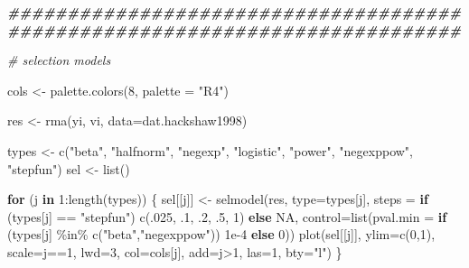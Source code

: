 \documentclass[
]{book}
\newenvironment{Shaded}{\begin{snugshade}}{\end{snugshade}}
\newcommand{\AttributeTok}[1]{\textcolor[rgb]{0.77,0.63,0.00}{#1}}
\newcommand{\CommentTok}[1]{\textcolor[rgb]{0.56,0.35,0.01}{\textit{#1}}}
\newcommand{\ConstantTok}[1]{\textcolor[rgb]{0.00,0.00,0.00}{#1}}
\newcommand{\ControlFlowTok}[1]{\textcolor[rgb]{0.13,0.29,0.53}{\textbf{#1}}}
\newcommand{\DecValTok}[1]{\textcolor[rgb]{0.00,0.00,0.81}{#1}}
\newcommand{\DocumentationTok}[1]{\textcolor[rgb]{0.56,0.35,0.01}{\textbf{\textit{#1}}}}
\newcommand{\FloatTok}[1]{\textcolor[rgb]{0.00,0.00,0.81}{#1}}
\newcommand{\FunctionTok}[1]{\textcolor[rgb]{0.00,0.00,0.00}{#1}}
\newcommand{\NormalTok}[1]{#1}
\newcommand{\OtherTok}[1]{\textcolor[rgb]{0.56,0.35,0.01}{#1}}
\newcommand{\SpecialCharTok}[1]{\textcolor[rgb]{0.00,0.00,0.00}{#1}}
\newcommand{\StringTok}[1]{\textcolor[rgb]{0.31,0.60,0.02}{#1}}
\begin{document}
\begin{Shaded}
\begin{Highlighting}[]
\DocumentationTok{\#\#\#\#\#\#\#\#\#\#\#\#\#\#\#\#\#\#\#\#\#\#\#\#\#\#\#\#\#\#\#\#\#\#\#\#\#\#\#\#\#\#\#\#\#\#\#\#\#\#\#\#\#\#\#\#\#\#\#\#\#\#\#\#\#\#\#\#\#\#\#\#\#\#\#\#}

\CommentTok{\# selection models}

\NormalTok{cols }\OtherTok{\textless{}{-}} \FunctionTok{palette.colors}\NormalTok{(}\DecValTok{8}\NormalTok{, }\AttributeTok{palette =} \StringTok{"R4"}\NormalTok{)}

\NormalTok{res }\OtherTok{\textless{}{-}} \FunctionTok{rma}\NormalTok{(yi, vi, }\AttributeTok{data=}\NormalTok{dat.hackshaw1998)}

\NormalTok{types }\OtherTok{\textless{}{-}} \FunctionTok{c}\NormalTok{(}\StringTok{"beta"}\NormalTok{, }\StringTok{"halfnorm"}\NormalTok{, }\StringTok{"negexp"}\NormalTok{, }\StringTok{"logistic"}\NormalTok{, }\StringTok{"power"}\NormalTok{, }\StringTok{"negexppow"}\NormalTok{, }\StringTok{"stepfun"}\NormalTok{)}
\NormalTok{sel }\OtherTok{\textless{}{-}} \FunctionTok{list}\NormalTok{()}

\ControlFlowTok{for}\NormalTok{ (j }\ControlFlowTok{in} \DecValTok{1}\SpecialCharTok{:}\FunctionTok{length}\NormalTok{(types)) \{}
\NormalTok{   sel[[j]] }\OtherTok{\textless{}{-}} \FunctionTok{selmodel}\NormalTok{(res, }\AttributeTok{type=}\NormalTok{types[j], }\AttributeTok{steps =} \ControlFlowTok{if}\NormalTok{ (types[j] }\SpecialCharTok{==} \StringTok{"stepfun"}\NormalTok{) }\FunctionTok{c}\NormalTok{(.}\DecValTok{025}\NormalTok{, .}\DecValTok{1}\NormalTok{, .}\DecValTok{2}\NormalTok{, .}\DecValTok{5}\NormalTok{, }\DecValTok{1}\NormalTok{) }\ControlFlowTok{else} \ConstantTok{NA}\NormalTok{,}
                        \AttributeTok{control=}\FunctionTok{list}\NormalTok{(}\AttributeTok{pval.min =} \ControlFlowTok{if}\NormalTok{ (types[j] }\SpecialCharTok{\%in\%} \FunctionTok{c}\NormalTok{(}\StringTok{"beta"}\NormalTok{,}\StringTok{"negexppow"}\NormalTok{)) }\FloatTok{1e{-}4} \ControlFlowTok{else} \DecValTok{0}\NormalTok{))}
   \FunctionTok{plot}\NormalTok{(sel[[j]], }\AttributeTok{ylim=}\FunctionTok{c}\NormalTok{(}\DecValTok{0}\NormalTok{,}\DecValTok{1}\NormalTok{), }\AttributeTok{scale=}\NormalTok{j}\SpecialCharTok{==}\DecValTok{1}\NormalTok{, }\AttributeTok{lwd=}\DecValTok{3}\NormalTok{, }\AttributeTok{col=}\NormalTok{cols[j], }\AttributeTok{add=}\NormalTok{j}\SpecialCharTok{\textgreater{}}\DecValTok{1}\NormalTok{, }\AttributeTok{las=}\DecValTok{1}\NormalTok{, }\AttributeTok{bty=}\StringTok{"l"}\NormalTok{)}
\NormalTok{\}}


\end{Highlighting}
\end{Shaded}
\end{document}
